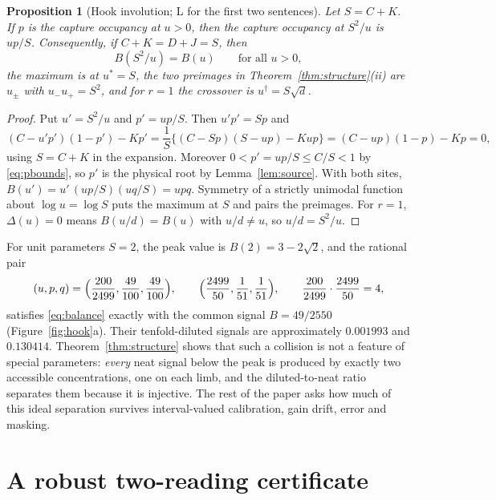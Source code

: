 \documentclass[11pt]{article}
\theoremstyle{plain}
\newtheorem{proposition}[theorem]{Proposition}
\theoremstyle{definition}
\numberwithin{equation}{section}
\newcommand{\Lean}{\textsf{L}}   %
\begin{document}
\begin{proposition}[Hook involution; \Lean{} for the first two sentences]\label{prop:involution}
Let $S=C+K$. If $p$ is the capture occupancy at $u>0$, then the capture occupancy
at $S^2/u$ is $up/S$. Consequently, if $C+K=D+J=S$, then
\begin{equation}\label{eq:involution}
 B(S^2/u)=B(u)\qquad\text{for all }u>0,
\end{equation}
the maximum is at $u^*=S$, the two preimages in
Theorem~\ref{thm:structure}\textup{(ii)} are $u_\pm$ with $u_-u_+=S^2$, and for $r=1$
the crossover is $u^\dagger=S\sqrt d$.
\end{proposition}
\begin{proof}
Put $u'=S^2/u$ and $p'=up/S$. Then $u'p'=Sp$ and
\[
 (C-u'p')(1-p')-Kp'=\frac1S\bigl\{(C-Sp)(S-up)-Kup\bigr\}
 =(C-up)(1-p)-Kp=0 ,
\]
using $S=C+K$ in the expansion. Moreover $0<p'=up/S\le C/S<1$ by
\eqref{eq:pbounds}, so $p'$ is the physical root by Lemma~\ref{lem:source}.
With both sites, $B(u')=u'\,(up/S)(uq/S)=upq$. Symmetry of a strictly unimodal
function about $\log u=\log S$ puts the maximum at $S$ and pairs the preimages.
For $r=1$, $\Delta(u)=0$ means $B(u/d)=B(u)$ with $u/d\ne u$, so
$u/d=S^2/u$.
\end{proof}

For unit parameters $S=2$, the peak value is $B(2)=3-2\sqrt2$, and the rational
pair
\begin{equation}\label{eq:collision}
 (u,p,q)=\Bigl(\frac{200}{2499},\frac{49}{100},\frac{49}{100}\Bigr),\qquad
 \Bigl(\frac{2499}{50},\frac1{51},\frac1{51}\Bigr),
 \qquad \frac{200}{2499}\cdot\frac{2499}{50}=4,
\end{equation}
satisfies \eqref{eq:balance} exactly with the common signal $B=49/2550$
(Figure~\ref{fig:hook}a). Their tenfold-diluted signals are approximately
$0.001993$ and $0.130414$. Theorem~\ref{thm:structure} shows that such a collision
is not a feature of special parameters: \emph{every} neat signal below the peak is
produced by exactly two accessible concentrations, one on each limb, and the
diluted-to-neat ratio separates them because it is injective. The rest of the paper
asks how much of this ideal separation survives interval-valued calibration, gain
drift, error and masking.


\section{A robust two-reading certificate}\label{sec:certificate}
\end{document}
